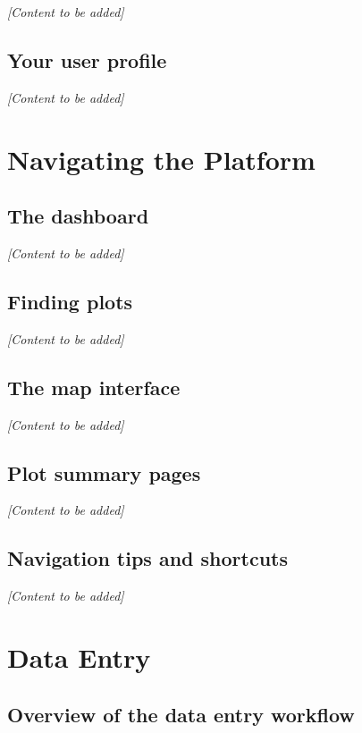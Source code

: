 \documentclass[
]{book}
\begin{document}
\emph{{[}Content to be added{]}}

\section{Your user profile}\label{your-user-profile}

\emph{{[}Content to be added{]}}

\chapter{Navigating the Platform}\label{navigating}

\section{The dashboard}\label{the-dashboard}

\emph{{[}Content to be added{]}}

\section{Finding plots}\label{finding-plots}

\emph{{[}Content to be added{]}}

\section{The map interface}\label{the-map-interface}

\emph{{[}Content to be added{]}}

\section{Plot summary pages}\label{plot-summary-pages}

\emph{{[}Content to be added{]}}

\section{Navigation tips and shortcuts}\label{navigation-tips-and-shortcuts}

\emph{{[}Content to be added{]}}

\chapter{Data Entry}\label{data-entry}

\section{Overview of the data entry workflow}\label{overview-of-the-data-entry-workflow}
\end{document}

